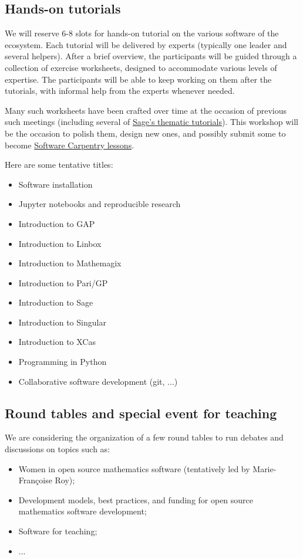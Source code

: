 \documentclass[12pt]{amsart}
\begin{document}
\subsection{Hands-on tutorials}

We will reserve 6-8 slots for hands-on tutorial on the various
software of the ecosystem. Each tutorial will be delivered by experts
(typically one leader and several helpers). After a brief overview,
the participants will be guided through a collection of exercise
worksheets, designed to accommodate various levels of expertise.  The
participants will be able to keep working on them after the tutorials,
with informal help from the experts whenever needed.

Many such worksheets have been crafted over time at the occasion of
previous such meetings (including several of
\href{http://doc.sagemath.org/html/en/thematic_tutorials/}{Sage's
  thematic tutorials}). This workshop will be the occasion to polish them,
design new ones, and possibly submit some to become
\href{http://software-carpentry.org/lessons/}{Software Carpentry lessons}.

Here are some tentative titles:
\begin{itemize}
\item Software installation
\item Jupyter notebooks and reproducible research
\item Introduction to GAP
\item Introduction to Linbox
\item Introduction to Mathemagix
\item Introduction to Pari/GP
\item Introduction to Sage
\item Introduction to Singular
\item Introduction to XCas
\item Programming in Python
\item Collaborative software development (git, ...)
\end{itemize}

\subsection{Round tables and special event for teaching}

We are considering the organization of a few round tables to run
debates and discussions on topics such as:

\begin{itemize}
\item Women in open source mathematics software (tentatively led by
  Marie-Françoise Roy);
\item Development models, best practices, and funding for open source
  mathematics software development;
\item Software for teaching;
\item ...
\end{itemize}
\end{document}
